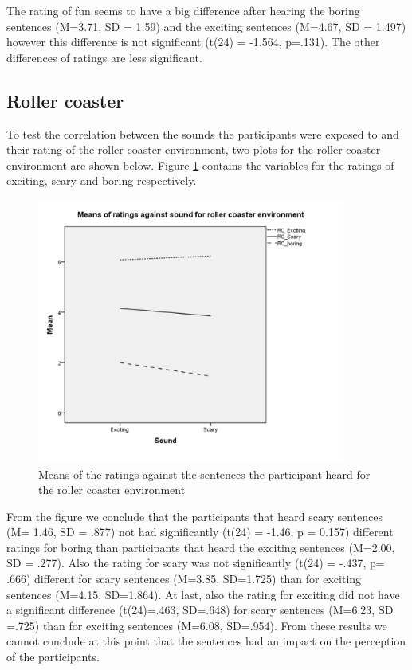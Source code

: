 \documentclass[Results.tex]{subfiles}
\begin{document}
The rating of fun seems to have a big difference after hearing the boring sentences (M=3.71, SD = 1.59) and the exciting sentences (M=4.67, SD = 1.497) however this difference is not significant (t(24) = -1.564, p=.131). The other differences of ratings are less significant.

\subsection{Roller coaster}
To test the correlation between the sounds the participants were exposed to and their rating of the roller coaster environment, two plots for the roller coaster environment are shown below. Figure \ref{fig:Ratings_sound_RC} contains the variables for the ratings of exciting, scary and boring respectively.

\begin{figure}[H]
	\centering
		\includegraphics[width=0.90\textwidth]{Section_1/Figures/Ratings_sound_RC.png}
	\caption{Means of the ratings against the sentences the participant heard for the roller coaster environment}
	\label{fig:Ratings_sound_RC}
\end{figure}

From the figure we conclude that the participants that heard scary sentences (M= 1.46, SD = .877) not had significantly (t(24) = -1.46, p = 0.157) different ratings for boring than participants that heard the exciting sentences (M=2.00, SD = .277). Also the rating for scary was not significantly (t(24) = -.437, p= .666) different for scary sentences (M=3.85, SD=1.725) than for exciting sentences (M=4.15, SD=1.864). At last, also the rating for exciting did not have a significant difference (t(24)=.463, SD=.648) for scary sentences (M=6.23, SD =.725) than for exciting sentences (M=6.08, SD=.954). From these results we cannot conclude at this point that the sentences had an impact on the perception of the participants. \\
\end{document}
